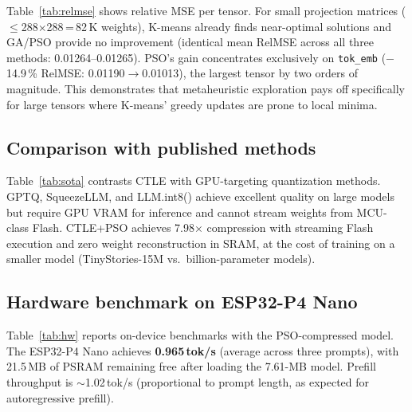 \documentclass[lettersize,journal]{IEEEtran}
\begin{document}
Table~\ref{tab:relmse} shows relative MSE per tensor.
For small projection matrices ($\leq$288$\times$288\,=\,82\,K weights),
K-means already finds near-optimal solutions and GA/PSO provide no improvement
(identical mean RelMSE across all three methods: 0.01264--0.01265).
PSO's gain concentrates exclusively on \texttt{tok\_emb}
($-$14.9\,\% RelMSE: 0.01190$\to$0.01013), the largest tensor by two
orders of magnitude.
This demonstrates that metaheuristic exploration pays off specifically for
large tensors where K-means' greedy updates are prone to local minima.



\subsection{Comparison with published methods}
\label{sec:sota}

Table~\ref{tab:sota} contrasts CTLE with GPU-targeting quantization methods.
GPTQ, SqueezeLLM, and LLM.int8() achieve excellent quality on large models
but require GPU VRAM for inference and cannot stream weights from
MCU-class Flash.
CTLE+PSO achieves 7.98$\times$ compression with streaming Flash execution and
zero weight reconstruction in SRAM, at the cost of training on a
smaller model (TinyStories-15M vs.\ billion-parameter models).



\subsection{Hardware benchmark on ESP32-P4 Nano}
\label{sec:hw_bench}

Table~\ref{tab:hw} reports on-device benchmarks with the PSO-compressed model.
The ESP32-P4 Nano achieves \textbf{0.965\,tok/s} (average across three prompts),
with 21.5\,MB of PSRAM remaining free after loading the 7.61-MB model.
Prefill throughput is $\sim$1.02\,tok/s (proportional to prompt length, as
expected for autoregressive prefill).


\end{document}
